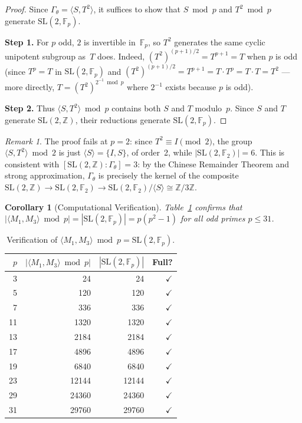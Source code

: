 \documentclass[12pt]{amsart}
\newtheorem{corollary}[theorem]{Corollary}
\theoremstyle{definition}
\theoremstyle{remark}
\newtheorem{remark}[theorem]{Remark}
\newcommand{\SL}{\mathrm{SL}}
\newcommand{\Fp}{\mathbb{F}_p}
\newcommand{\Z}{\mathbb{Z}}
\begin{document}
\begin{proof}
Since $\Gamma_\theta = \langle S, T^2\rangle$, it suffices to show that
$S \bmod p$ and $T^2 \bmod p$ generate $\SL(2,\Fp)$.

\medskip\noindent\textbf{Step 1.}
For $p$ odd, $2$ is invertible in~$\Fp$, so $T^2$ generates the same
cyclic unipotent subgroup as~$T$ does.  Indeed,
$(T^2)^{(p+1)/2} = T^{p+1} = T$ when $p$ is odd (since $T^p = T$ in
$\SL(2,\Fp)$ and $(T^2)^{(p+1)/2} = T^{p+1} = T \cdot T^p = T \cdot T = T^2$
--- more directly, $T = (T^2)^{2^{-1} \bmod p}$ where $2^{-1}$ exists
because $p$ is odd).

\medskip\noindent\textbf{Step 2.}
Thus $\langle S, T^2\rangle \bmod p$ contains both $S$ and $T$ modulo~$p$.
Since $S$ and $T$ generate $\SL(2,\Z)$, their reductions generate
$\SL(2,\Fp)$.
\end{proof}

\begin{remark}
The proof fails at $p=2$: since $T^2 \equiv I \pmod{2}$, the group
$\langle S, T^2\rangle \bmod 2$ is just $\langle S\rangle = \{I, S\}$,
of order~2, while $|\SL(2,\mathbb{F}_2)| = 6$.  This is consistent with
$[\SL(2,\Z) : \Gamma_\theta] = 3$: by the Chinese Remainder Theorem and
strong approximation, $\Gamma_\theta$ is precisely the kernel of the
composite
$\SL(2,\Z) \to \SL(2,\mathbb{F}_2) \to \SL(2,\mathbb{F}_2)/\langle
S\rangle \cong \Z/3\Z$.
\end{remark}

\begin{corollary}[Computational Verification]
Table~\ref{tab:verify} confirms that $|\langle M_1,M_3\rangle \bmod p|
= |\SL(2,\Fp)| = p(p^2-1)$ for all odd primes $p \le 31$.
\end{corollary}

\begin{table}[ht]
\centering
\caption{Verification of $\langle M_1, M_3\rangle \bmod p = \SL(2,\Fp)$.}
\label{tab:verify}
\begin{tabular}{rrrr}
\toprule
$p$ & $|\langle M_1,M_3\rangle \bmod p|$ & $|\SL(2,\Fp)|$ & Full? \\
\midrule
3  & 24     & 24     & $\checkmark$ \\
5  & 120    & 120    & $\checkmark$ \\
7  & 336    & 336    & $\checkmark$ \\
11 & 1320   & 1320   & $\checkmark$ \\
13 & 2184   & 2184   & $\checkmark$ \\
17 & 4896   & 4896   & $\checkmark$ \\
19 & 6840   & 6840   & $\checkmark$ \\
23 & 12144  & 12144  & $\checkmark$ \\
29 & 24360  & 24360  & $\checkmark$ \\
31 & 29760  & 29760  & $\checkmark$ \\
\bottomrule
\end{tabular}
\end{table}
\end{document}
